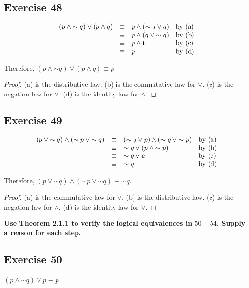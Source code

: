 \documentclass[14pt]{extarticle}
\newcommand{\true}{{\bf t}}
\newcommand{\false}{{\bf c}}
\begin{document}
\subsection{Exercise 48}
$$
\begin{array}{rcll}
(p \wedge {\sim q}) \vee (p \wedge q) & \equiv & 
 p \wedge ({\sim q} \vee q) & \text{by (a)} \\
& \equiv & p \wedge (q \vee {\sim q}) & \text{by (b)} \\
& \equiv & p \wedge \true & \text{by (c)} \\
& \equiv & p & \text{by (d)} \\
\end{array}
$$

Therefore, $(p \wedge {\sim q}) \vee (p \wedge q) \equiv p$.

\begin{proof}
(a) is the distributive law. (b) is the commutative law for $\vee$. (c) is the
negation law for $\vee$. (d) is the identity law for $\wedge$.
\end{proof}

\subsection{Exercise 49}
$$
\begin{array}{rcll}
(p \vee {\sim q}) \wedge ({\sim p} \vee {\sim q}) & \equiv &
({\sim q} \vee p) \wedge ({\sim q} \vee {\sim p}) & \text{by (a)} \\
& \equiv & {\sim q} \vee (p \wedge {\sim p}) & \text{by (b)} \\
& \equiv & {\sim q} \vee \false & \text{by (c)} \\
& \equiv & {\sim q} & \text{by (d)} \\
\end{array}
$$

Therefore, $(p \vee {\sim q}) \wedge ({\sim p} \vee {\sim q}) \equiv {\sim q}$.

\begin{proof}
(a) is the commutative law for $\vee$. (b) is the distributive law. (c) is the
negation law for $\wedge$. (d) is the identity law for $\vee$.
\end{proof}

{\bf Use Theorem 2.1.1 to verify the logical equivalences in $50-54$. Supply a
reason for each step.}

\subsection{Exercise 50}
$(p \wedge {\sim q}) \vee p \equiv p$
\end{document}
